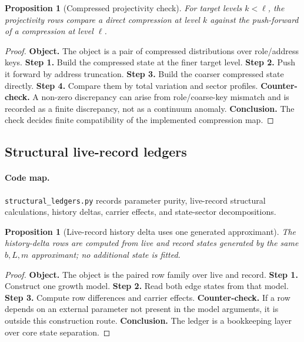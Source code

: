 \documentclass[11pt]{article}
\newtheorem{proposition}[definition]{Proposition}
\theoremstyle{remark}
\newcommand{\code}[1]{\texttt{#1}}
\numberwithin{equation}{section}
\begin{document}
\begin{proposition}[Compressed projectivity check]
For target levels \(k<\ell\), the projectivity rows compare a direct compression at level \(k\) against the push-forward of a compression at level \(\ell\).
\end{proposition}
\begin{proof}
\textbf{Object.} The object is a pair of compressed distributions over role/address keys. \textbf{Step 1.} Build the compressed state at the finer target level. \textbf{Step 2.} Push it forward by address truncation. \textbf{Step 3.} Build the coarser compressed state directly. \textbf{Step 4.} Compare them by total variation and sector profiles. \textbf{Counter-check.} A non-zero discrepancy can arise from role/coarse-key mismatch and is recorded as a finite discrepancy, not as a continuum anomaly. \textbf{Conclusion.} The check decides finite compatibility of the implemented compression map.
\end{proof}

\subsection{Structural live-record ledgers}
\paragraph{Code map.} \code{structural\_\allowbreak{}ledgers.py} records parameter purity, live-record structural calculations, history deltas, carrier effects, and state-sector decompositions.

\begin{proposition}[Live-record history delta uses one generated approximant]
The history-delta rows are computed from live and record states generated by the same \(b,L,m\) approximant; no additional state is fitted.
\end{proposition}
\begin{proof}
\textbf{Object.} The object is the paired row family over \(\mathrm{live}\) and \(\mathrm{record}\). \textbf{Step 1.} Construct one growth model. \textbf{Step 2.} Read both edge states from that model. \textbf{Step 3.} Compute row differences and carrier effects. \textbf{Counter-check.} If a row depends on an external parameter not present in the model arguments, it is outside this construction route. \textbf{Conclusion.} The ledger is a bookkeeping layer over core state separation.
\end{proof}
\end{document}
